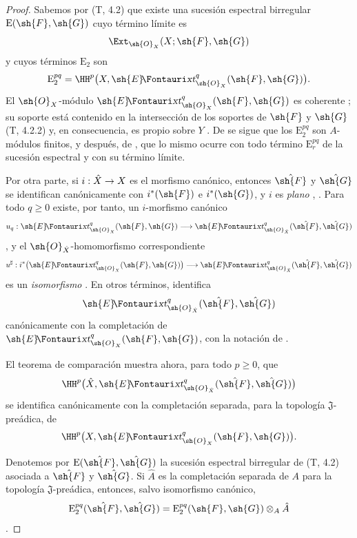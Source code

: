 \documentclass[oneside]{amsart}
\makeatletter
\renewcommand{\geq}{\geqslant}
\newcommand{\ega@arrow}[2]{\mathchoice{#1}{#2}{#2}{#2}}
\renewcommand{\to}{\ega@arrow{\longrightarrow}{\rightarrow}}
\newcommand*{\ega@sheafop}[3]{\sh{#1}#2\textup{\kern-2.2pt{\Fontauri\slshape #3}}}
\newcommand*{\shExt}{\ega@sheafop{E}{}{xt}}
\newcommand{\oldpage}[2][]{{\marginnote{\normalfont\textbf{#1}~|~#2}}\ignorespaces}
\makeatother
\begin{document}
\begin{proof}
Sabemos por (T, 4.2) que existe una sucesión espectral birregular
$\mathrm{E}(\sh{F},\sh{G})$ cuyo término límite es
\[
  \Ext_{\sh{O}_X}(X;\sh{F},\sh{G})
\]
y cuyos términos $\mathrm{E}_2$ son
\[
  \mathrm{E}_2^{pq}
  =\HH^p\bigl(X,\shExt^q_{\sh{O}_X}(\sh{F},\sh{G})\bigr).
\]
El $\sh{O}_X$-módulo
$\shExt^q_{\sh{O}_X}(\sh{F},\sh{G})$ es coherente
; su soporte está contenido en la intersección de
los soportes de $\sh{F}$ y $\sh{G}$ (T, 4.2.2) y, en consecuencia, es
propio sobre $Y$ . De  se sigue
que los $\mathrm{E}_2^{pq}$ son $A$-módulos finitos, y después, de
, que lo mismo ocurre con todo término
$\mathrm{E}_r^{pq}$ de la sucesión espectral y con su término límite.

Por otra parte, si $i:\hat{X}\to X$ es el morfismo canónico, entonces
$\hat{\sh{F}}$ y $\hat{\sh{G}}$ se identifican canónicamente con
$i^*(\sh{F})$ e $i^*(\sh{G})$, y $i$ es \emph{plano}
, . Para todo $q\geq0$ existe,
por tanto, un $i$-morfismo canónico
\[
  u_q:\shExt^q_{\sh{O}_X}(\sh{F},\sh{G})
  \longrightarrow
  \shExt^q_{\sh{O}_{\hat{X}}}
    (\hat{\sh{F}},\hat{\sh{G}})
\]
, y el $\sh{O}_{\hat{X}}$-homomorfismo
correspondiente
\[
  u^\sharp:
  i^*\bigl(\shExt^q_{\sh{O}_X}(\sh{F},\sh{G})\bigr)
  \longrightarrow
  \shExt^q_{\sh{O}_{\hat{X}}}
    (\hat{\sh{F}},\hat{\sh{G}})
\]
es un \emph{isomorfismo} . En otros términos,
 identifica
\[
  \shExt^q_{\sh{O}_{\hat{X}}}
    (\hat{\sh{F}},\hat{\sh{G}})
\]
canónicamente con la completación de
$\shExt^q_{\sh{O}_X}(\sh{F},\sh{G})$, con la notación de
.

El teorema de comparación  muestra ahora, para todo
$p\geq0$, que
\[
  \HH^p\bigl(\hat{X},
    \shExt^q_{\sh{O}_{\hat{X}}}
      (\hat{\sh{F}},\hat{\sh{G}})\bigr)
\]
se identifica canónicamente con la completación separada, para la
topología $\mathfrak J$-preádica, de
\[
  \HH^p\bigl(X,\shExt^q_{\sh{O}_X}(\sh{F},\sh{G})\bigr).
\]

\oldpage[III]{139}

Denotemos por $\mathrm{E}(\hat{\sh{F}},\hat{\sh{G}})$ la sucesión
espectral birregular de (T, 4.2) asociada a $\hat{\sh{F}}$ y
$\hat{\sh{G}}$. Si $\hat{A}$ es la completación separada de $A$ para
la topología $\mathfrak J$-preádica, entonces, salvo isomorfismo
canónico,
\[
  \mathrm{E}_2^{pq}(\hat{\sh{F}},\hat{\sh{G}})
  =
  \mathrm{E}_2^{pq}(\sh{F},\sh{G})\otimes_A\hat{A}
\]
.


\end{proof}
\end{document}
